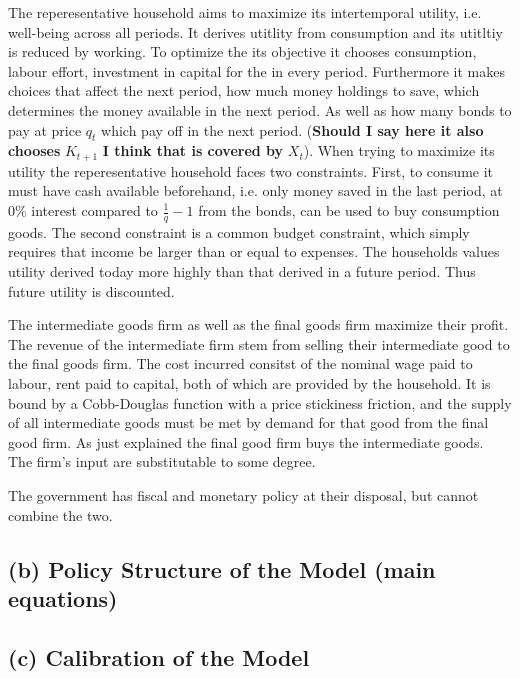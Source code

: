 \documentclass[12pt]{article}
\begin{document}
The reperesentative household aims to maximize its intertemporal utility, i.e. well-being 
across all periods. It derives utitlity from consumption and its utitltiy is reduced by working. To optimize the its objective
it chooses consumption, labour effort, investment in capital for the in every period. %
Furthermore it makes choices that affect the next period,  how much money holdings to save, which determines the money available
in the next period. As well as how many bonds to pay at price $q_t$ which pay off in the next period. (\textbf{Should 
I say here it also chooses} $K_{t+1}$ \textbf{I think that is covered by } $X_t$). When trying to maximize its utility
the reperesentative household faces two constraints. First, to consume it must have cash available beforehand, i.e. only money 
saved in the last period, at 0\% interest compared to $\frac{1}{q} -1$ from the bonds, can be used to buy consumption goods. 
The second constraint is a common budget constraint, which simply requires that income be larger than or equal to expenses. 
The households values utility derived today more highly than that derived in a future period. Thus future utility is discounted. 

The intermediate goods firm as well as the final goods firm maximize their profit. 
The revenue of the intermediate firm stem from selling their intermediate good to the 
final goods firm. The cost incurred consitst of the nominal wage paid to labour, rent paid to capital, both
of which are provided by the household. It is bound by a Cobb-Douglas function with a price stickiness friction, and 
the supply of all intermediate goods must be met by demand for that good from the final good firm. 
As just explained the final good firm buys the intermediate goods. The firm's input are substitutable to some degree. 

The government has fiscal and monetary policy at their disposal, but cannot combine the two. 



\subsection*{(b) Policy Structure of the Model (main equations)}

\subsection*{(c) Calibration of the Model}
\end{document}

